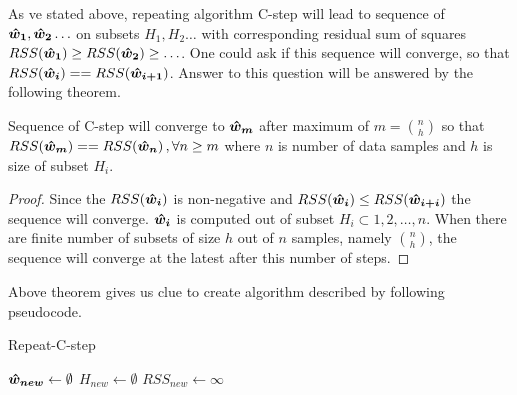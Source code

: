 As ve stated above, repeating algorithm C-step will lead to sequence of $\boldsymbol{\hat{w}_1}, \boldsymbol{\hat{w}_2} \ldots$ 
on subsets $H_1, H_2 \ldots$ with corresponding residual sum of squares
$RSS(\boldsymbol{\hat{w}_{1}}) \geq RSS(\boldsymbol{\hat{w}_{2}}) \geq \ldots$. One could ask if this sequence will converge, so that
$RSS(\boldsymbol{\hat{w}_{i}}) == RSS(\boldsymbol{\hat{w}_{i+1}})$. 
Answer to this question will be answered by the following theorem.


\begin{theorem}
	Sequence of C-step will converge to $\boldsymbol{\hat{w}_{m}}$ after maximum of $m = {n \choose h}$
	so that $RSS(\boldsymbol{\hat{w}_{m}}) == RSS(\boldsymbol{\hat{w}_{n}})\,, \forall n\geq m$ where $n$ is number of data samples 
	and $h$ is size of subset $H_i$.
\end{theorem}

\begin{proof}
	Since  the $RSS(\boldsymbol{\hat{w}_{i}})$ is non-negative and $RSS(\boldsymbol{\hat{w}_{i}}) \leq RSS(\boldsymbol{\hat{w}_{i+i}})$ the 
	sequence will converge. $\boldsymbol{\hat{w}_{i}}$  is computed out of subset 
	$H_i \subset {1,2,\ldots,n}$. When there are finite number of subsets of size $h$ out of $n$ samples, namely ${n \choose h}$, the sequence will converge at the latest after this number of steps.
\end{proof}

Above theorem gives us clue to create algorithm described by following pseudocode.



\begin{algorithm}[H]
	\label{alg:RepeatCstep}
	\caption{Repeat-C-step}
	$\boldsymbol{\hat{w}_{new}} \gets \emptyset$\;
	$H_{new} \gets \emptyset$\;
	$RSS_{new} \gets \infty $\;


	\;
\end{algorithm}

